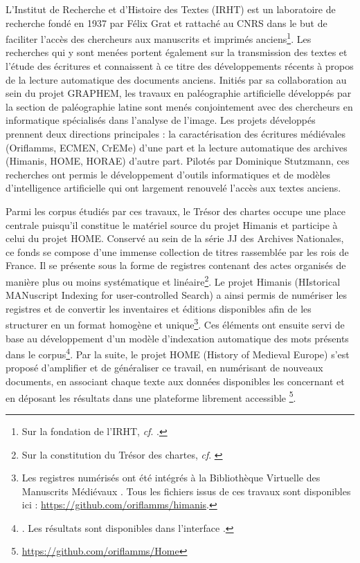 \documentclass[a4paper,12pt,twoside]{book}
\begin{document}
	L'Institut de Recherche et d'Histoire des Textes (IRHT) est un laboratoire de recherche fondé en 1937 par Félix Grat et rattaché au CNRS dans le but de faciliter l'accès des chercheurs aux manuscrits et imprimés anciens\footnote{Sur la fondation de l'IRHT, \textit{cf}. \cite{holtz_les_2000}.}. Les recherches qui y sont menées portent également sur la transmission des textes et l'étude des écritures et connaissent à ce titre des développements récents à propos de la lecture automatique des documents anciens. Initiés par sa collaboration au sein du projet GRAPHEM, les travaux en \og paléographie artificielle\fg{} développés par la section de paléographie latine sont menés conjointement avec des chercheurs en informatique spécialisés dans l'analyse de l'image. Les projets développés prennent deux directions principales : la caractérisation des écritures médiévales (Oriflamms, ECMEN, CrEMe) d'une part et la lecture automatique des archives (Himanis, HOME, HORAE) d'autre part. Pilotés par Dominique Stutzmann, ces recherches ont permis le développement d'outils informatiques et de modèles d'intelligence artificielle qui ont largement renouvelé l'accès aux textes anciens.
	
	Parmi les corpus étudiés par ces travaux, le Trésor des chartes occupe une place centrale puisqu'il constitue le matériel source du projet Himanis et participe à celui du projet HOME. Conservé au sein de la série JJ des Archives Nationales, ce fonds se compose d'une immense collection de titres rassemblée par les rois de France. Il se présente sous la forme de registres contenant des actes organisés de manière plus ou moins systématique et linéaire\footnote{Sur la constitution du Trésor des chartes, \textit{cf}. \cite{potin_mise_2007}}. Le projet Himanis (HIstorical MANuscript Indexing for user-controlled Search) a ainsi permis de numériser les registres et de convertir les inventaires et éditions disponibles afin de les structurer en un format homogène et unique\footnote{Les registres numérisés ont été intégrés à la Bibliothèque Virtuelle des Manuscrits Médiévaux \cite{noauthor_bvmm_nodate}. Tous les fichiers issus de ces travaux sont disponibles ici : \url{https://github.com/oriflamms/himanis}.}. Ces éléments ont ensuite servi de base au développement d'un modèle d'indexation automatique des mots présents dans le corpus\footnote{\cites{stutzmann_recherche_2017}. Les résultats sont disponibles dans l'interface \cite{noauthor_himanis_nodate}.}. Par la suite, le projet HOME (History of Medieval Europe) s'est proposé d'amplifier et de généraliser ce travail, en numérisant de nouveaux documents, en associant chaque texte aux données disponibles les concernant et en déposant les résultats dans une plateforme librement accessible \footnote{\url{https://github.com/oriflamms/Home}}.
	
\end{document}
